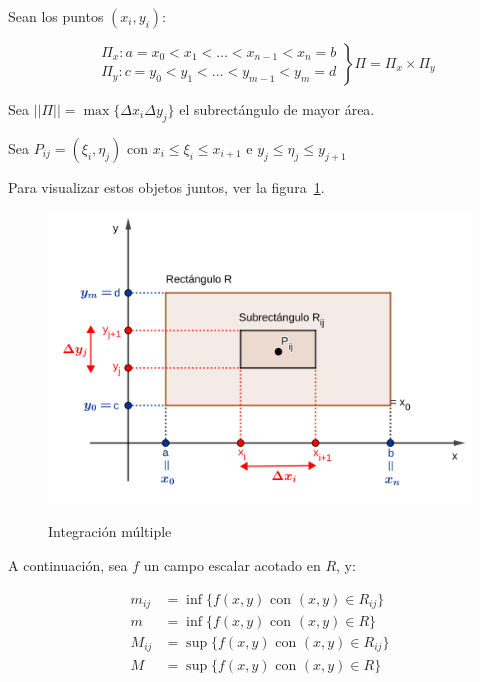 \documentclass{article}
\begin{document}
Sean los puntos $(x_i, y_i)$:

\begin{equation}
\left.
\begin{array}{ll}
& \Pi_x: a = x_0 < x_1 < \ldots < x_{n-1} < x_n = b \\
& \Pi_y: c = y_0 < y_1 < \ldots < y_{m-1} < y_m = d
\end{array}
\right\} \Pi = \Pi_x \times \Pi_y
\end{equation}

Sea $||\Pi|| = \max\{ \Delta x_i \Delta y_j \}$ el subrectángulo de mayor área.

Sea $P_{ij} = (\xi_i, \eta_j)$ con $x_i \leq \xi_i \leq x_{i+1}$ e $y_j \leq \eta_j \leq y_{j+1}$

Para visualizar estos objetos juntos, ver la figura~\ref{fig:intmul}.

\begin{figure}[ht]
\centering
\caption{Integración múltiple}
\includegraphics[scale=0.8]{img/teo_fig016_im.png}
\label{fig:intmul}
\end{figure}

A continuación, sea $f$ un campo escalar acotado en $R$, y:

\begin{align}
m_{ij} &= \inf \{ f(x,y) \text{ con } (x,y) \in R_{ij} \} \\
m &= \inf \{ f(x,y) \text{ con } (x,y) \in R \} \\
M_{ij} &= \sup \{ f(x,y) \text{ con } (x,y) \in R_{ij} \} \\
M &= \sup\{ f(x,y) \text{ con } (x,y) \in R \} \\
\end{align}
\end{document}
